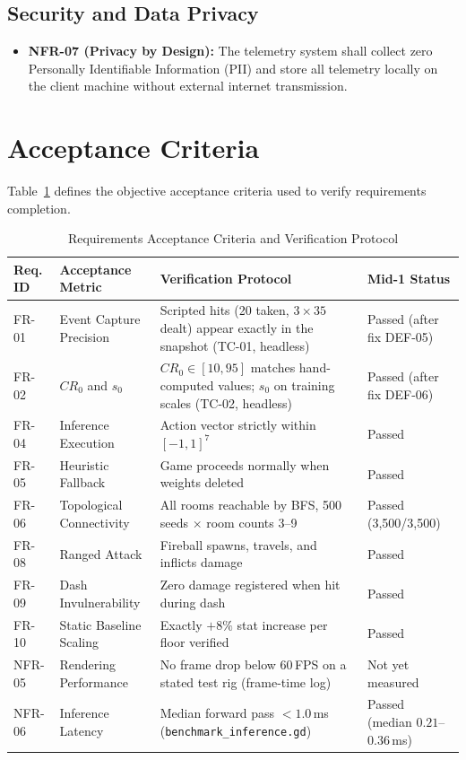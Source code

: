 \subsection{Security and Data Privacy}
\begin{itemize}
    \item \textbf{NFR-07 (Privacy by Design):} The telemetry system shall collect zero Personally Identifiable Information (PII) and store all telemetry locally on the client machine without external internet transmission.
\end{itemize}

\section{Acceptance Criteria}
Table~\ref{tab:acceptance_criteria} defines the objective acceptance criteria used to verify requirements completion.

\begin{table}[!htbp]
\centering
\caption{Requirements Acceptance Criteria and Verification Protocol}
\label{tab:acceptance_criteria}
\small
\begin{tabular}{p{}p{}p{}p{}}
\toprule
\textbf{Req. ID} & \textbf{Acceptance Metric} & \textbf{Verification Protocol} & \textbf{Mid-1 Status} \\
\midrule
FR-01 & Event Capture Precision & Scripted hits (20 taken, $3\times35$ dealt) appear exactly in the snapshot (TC-01, headless) & Passed (after fix DEF-05) \\
FR-02 & $CR_0$ and $s_0$ & $CR_0 \in [10, 95]$ matches hand-computed values; $s_0$ on training scales (TC-02, headless) & Passed (after fix DEF-06) \\
FR-04 & Inference Execution & Action vector strictly within $[-1, 1]^7$ & Passed \\
FR-05 & Heuristic Fallback & Game proceeds normally when weights deleted & Passed \\
FR-06 & Topological Connectivity & All rooms reachable by BFS, 500 seeds $\times$ room counts 3--9 & Passed (3,500/3,500) \\
FR-08 & Ranged Attack & Fireball spawns, travels, and inflicts damage & Passed \\
FR-09 & Dash Invulnerability & Zero damage registered when hit during dash & Passed \\
FR-10 & Static Baseline Scaling & Exactly $+8\%$ stat increase per floor verified & Passed \\
NFR-05 & Rendering Performance & No frame drop below 60\,FPS on a stated test rig (frame-time log) & Not yet measured \\
NFR-06 & Inference Latency & Median forward pass $<1.0$\,ms (\texttt{benchmark\_inference.gd}) & Passed (median $0.21$--$0.36$\,ms) \\
\bottomrule
\end{tabular}
\end{table}


